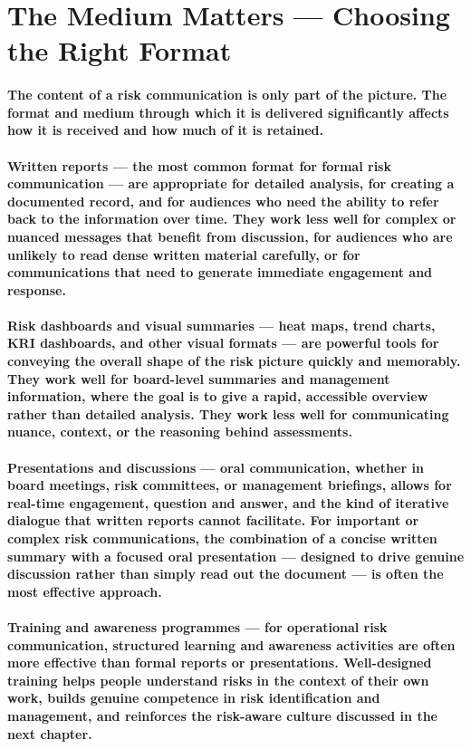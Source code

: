 \section{The Medium Matters — Choosing the Right Format}
\paragraph{The content of a risk communication is only part of the picture. The format and medium through which it is delivered significantly affects how it is received and how much of it is retained.}
\paragraph{\textbf{Written reports} — the most common format for formal risk communication — are appropriate for detailed analysis, for creating a documented record, and for audiences who need the ability to refer back to the information over time. They work less well for complex or nuanced messages that benefit from discussion, for audiences who are unlikely to read dense written material carefully, or for communications that need to generate immediate engagement and response.}
\paragraph{\textbf{Risk dashboards and visual summaries} — heat maps, trend charts, KRI dashboards, and other visual formats — are powerful tools for conveying the overall shape of the risk picture quickly and memorably. They work well for board-level summaries and management information, where the goal is to give a rapid, accessible overview rather than detailed analysis. They work less well for communicating nuance, context, or the reasoning behind assessments.}
\paragraph{\textbf{Presentations and discussions} — oral communication, whether in board meetings, risk committees, or management briefings, allows for real-time engagement, question and answer, and the kind of iterative dialogue that written reports cannot facilitate. For important or complex risk communications, the combination of a concise written summary with a focused oral presentation — designed to drive genuine discussion rather than simply read out the document — is often the most effective approach.}
\paragraph{\textbf{Training and awareness programmes} — for operational risk communication, structured learning and awareness activities are often more effective than formal reports or presentations. Well-designed training helps people understand risks in the context of their own work, builds genuine competence in risk identification and management, and reinforces the risk-aware culture discussed in the next chapter.}
